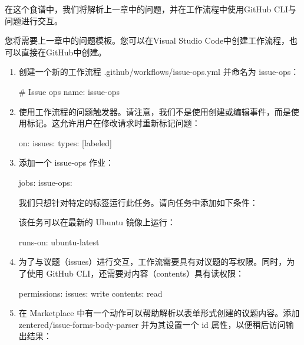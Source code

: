 
在这个食谱中，我们将解析上一章中的问题，并在工作流程中使用GitHub CLI与问题进行交互。


您将需要上一章中的问题模板。您可以在Visual Studio Code中创建工作流程，也可以直接在GitHub中创建。


\begin{enumerate}
\item 
创建一个新的工作流程 .github/workflows/issue-ops.yml 并命名为 issue-ops：

\begin{shell}
# Issue ops
name: issue-ops
\end{shell}

\item 
使用工作流程的问题触发器。请注意，我们不是使用创建或编辑事件，而是使用标记。这允许用户在修改请求时重新标记问题：

\begin{shell}
on:
  issues:
    types: [labeled]
\end{shell}

\item 
添加一个 issue-ops 作业：

\begin{shell}
jobs:
  issue-ops:
\end{shell}

我们只想针对特定的标签运行此任务。请向任务中添加如下条件：


该任务可以在最新的 Ubuntu 镜像上运行：

\begin{shell}
runs-on: ubuntu-latest
\end{shell}

\item 
为了与议题（issues）进行交互，工作流需要具有对议题的写权限。同时，为了使用 GitHub CLI，还需要对内容（contents）具有读权限：

\begin{shell}
permissions:
  issues: write
  contents: read
\end{shell}

\item 
在 Marketplace 中有一个动作可以帮助解析以表单形式创建的议题内容。添加 zentered/issue-forms-body-parser 并为其设置一个 id 属性，以便稍后访问输出结果：


\end{enumerate}
